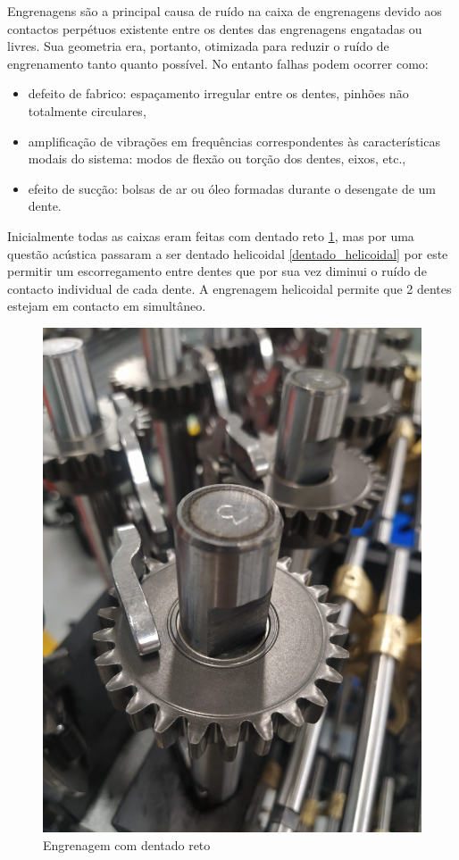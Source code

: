 Engrenagens são a principal causa de ruído na caixa de engrenagens devido aos contactos perpétuos existente entre os dentes das engrenagens engatadas ou livres. Sua geometria era, portanto, otimizada para reduzir o ruído de engrenamento tanto quanto possível. No entanto falhas podem ocorrer como:
\begin{itemize}
\item defeito de fabrico: espaçamento irregular entre os dentes, pinhões não totalmente circulares,
\item amplificação de vibrações em frequências correspondentes às características modais
do sistema: modos de flexão ou torção dos dentes, eixos, etc.,
\item efeito de sucção: bolsas de ar ou óleo formadas durante o desengate de um dente.\cite{Grainolement}
\end{itemize}

Inicialmente todas as caixas eram feitas com dentado reto \ref{dentado_reto}, mas por uma questão acústica passaram a ser dentado helicoidal \ref{dentado_helicoidal} por este permitir um escorregamento entre dentes que por sua vez diminui o ruído de contacto individual de cada dente. A engrenagem helicoidal permite que 2 dentes estejam em contacto em simultâneo. 

\begin{figure}[H]
\centering
\includegraphics[scale=0.1]{figs/dentado_reto}
\caption{Engrenagem com dentado reto}\label{dentado_reto}
\end{figure}



